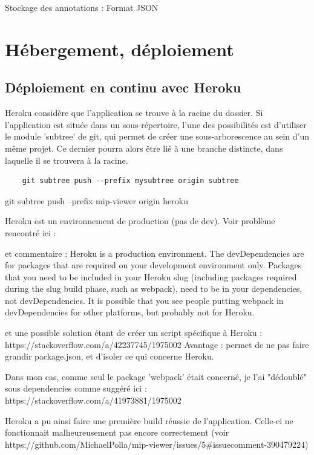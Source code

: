 Stockage des annotations :
Format JSON

\section{Hébergement, déploiement}

\subsection{Déploiement en continu avec Heroku}

Heroku considère que l'application se trouve à la racine du dossier.
Si l'application est située dans un sous-répertoire, l'une des possibilités est d'utiliser le module 'subtree' de git, qui permet de créer une sous-arborescence au sein d'un même projet. Ce dernier pourra alors être lié à une branche distincte, dans laquelle il se trouvera à la racine.
\begin{verbatim}
    git subtree push --prefix mysubtree origin subtree
\end{verbatim}

git subtree push --prefix mip-viewer origin heroku

Heroku est un environnement de production (pas de dev). Voir problème rencontré ici :

et commentaire :
Heroku is a production environment. The devDependencies are for packages that are required on your development environment only. Packages that you need to be included in your Heroku slug (including packages required during the slug build phase, such as webpack), need to be in your dependencies, not devDependencies. It is possible that you see people putting webpack in devDependencies for other platforms, but probably not for Heroku. 

et une possible solution étant de créer un script spécifique à Heroku : https://stackoverflow.com/a/42237745/1975002
Avantage : permet de ne pas faire grandir package.json, et d'isoler ce qui concerne Heroku.

Dans mon cas, comme seul le package 'webpack' était concerné, je l'ai "dédoublé" sous dependencies comme suggéré ici : https://stackoverflow.com/a/41973881/1975002

Heroku a pu ainsi faire une première build réussie de l'application. Celle-ci ne fonctionnait malheureusement pas encore correctement (voir https://github.com/MichaelPolla/mip-viewer/issues/5#issuecomment-390479224) 